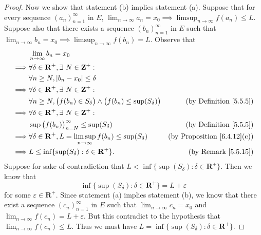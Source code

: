 \begin{proof}
    Now we show that statement (b) implies statement (a).
    Suppose that for every sequence \((a_n)_{n = 1}^\infty\) in \(E\), \(\lim_{n \to \infty} a_n = x_0 \implies \limsup_{n \to \infty} f(a_n) \leq L\).
    Suppose also that there exists a sequence \((b_n)_{n = 1}^\infty\) in \(E\) such that \(\lim_{n \to \infty} b_n = x_0 \implies \limsup_{n \to \infty} f(b_n) = L\).
    Observe that
    \begin{align*}
                 & \lim_{n \to \infty} b_n = x_0                                                                                                            \\
        \implies & \forall \delta \in \mathbf{R}^+, \exists\ N \in \mathbf{Z}^+ :                                                                           \\
                 & \forall n \geq N, \abs*{b_n - x_0} \leq \delta                                                                                           \\
        \implies & \forall \delta \in \mathbf{R}^+, \exists\ N \in \mathbf{Z}^+ :                                                                           \\
                 & \forall n \geq N, \big(f(b_n) \in S_{\delta}\big) \land \big(f(b_n) \leq \sup(S_{\delta})\big) & \text{(by Definition \ref{5.5.5})}      \\
        \implies & \forall \delta \in \mathbf{R}^+, \exists\ N \in \mathbf{Z}^+ :                                                                           \\
                 & \sup\big(f(b_n)\big)_{n = N}^\infty \leq \sup(S_{\delta})                                      & \text{(by Definition \ref{5.5.5})}      \\
        \implies & \forall \delta \in \mathbf{R}^+, L = \limsup_{n \to \infty} f(b_n) \leq \sup(S_{\delta})       & \text{(by Proposition \ref{6.4.12}(c))} \\
        \implies & L \leq \inf\{\sup(S_{\delta}) : \delta \in \mathbf{R}^+\}.                                     & \text{(by Remark \ref{5.5.15})}
    \end{align*}
    Suppose for sake of contradiction that \(L < \inf\{\sup(S_\delta) : \delta \in \mathbf{R}^+\}\).
    Then we know that
    \[
        \inf\{\sup(S_\delta) : \delta \in \mathbf{R}^+\} = L + \varepsilon
    \]
    for some \(\varepsilon \in \mathbf{R}^+\).
    Since statement (a) implies statement (b), we know that there exist a sequence \((c_n)_{n = 1}^\infty\) in \(E\) such that \(\lim_{n \to \infty} c_n = x_0\) and \(\lim_{n \to \infty} f(c_n) = L + \varepsilon\).
    But this contradict to the hypothesis that \(\lim_{n \to \infty} f(c_n) \leq L\).
    Thus we must have \(L = \inf\{\sup(S_{\delta}) : \delta \in \mathbf{R}^+\}\).
\end{proof}

